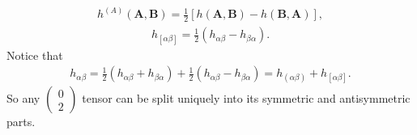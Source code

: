 \documentclass[11pt,letterpaper]{book}
\begin{document}
    \begin{align}
    h^{(A)}(\mathbf{A},\mathbf{B}) = \frac{1}{2} \left[ h(\mathbf{A},\mathbf{B}) - h(\mathbf{B},\mathbf{A}) \right],
    \end{align}
    \begin{align}
    h_{[\alpha\beta]} = \frac{1}{2} \left( h_{\alpha\beta} - h_{\beta\alpha} \right). \tag{3.34}
    \end{align}
    Notice that
    \begin{align}
    h_{\alpha\beta} = \frac{1}{2} \left( h_{\alpha\beta} + h_{\beta\alpha} \right) + \frac{1}{2} \left( h_{\alpha\beta} - h_{\beta\alpha} \right)
    = h_{(\alpha\beta)} + h_{[\alpha\beta]}. \tag{3.35}
    \end{align}
    So any \(\left(\begin{array}{c} 0 \\ 2 \end{array}\right)\) tensor can be split uniquely into its symmetric and antisymmetric parts.
    
\end{document}
